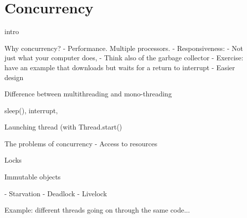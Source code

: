 
\section{Concurrency}
\label{sec:concurrency}

intro

Why concurrency?
  - Performance. Multiple processors.
  - Responsiveness: 
    - Not just what your computer does, 
    - Think also of the garbage collector
    - Exercise: have an example that downloads but waits for a return
      to interrupt
  - Easier design


Difference between multithreading and mono-threading

sleep(), interrupt, 

Launching thread (with Thread.start()

The problems of concurrency
  - Access to resources

Locks

Immutable objects

    - Starvation
    - Deadlock
    - Livelock


Example: different threads going on through the same code...

